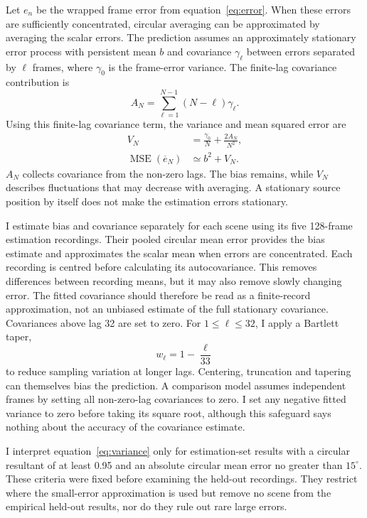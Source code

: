 \documentclass{edpsci}
\begin{document}
Let $e_n$ be the wrapped frame error from equation~\ref{eq:error}. When these errors are sufficiently concentrated, circular averaging can be approximated by averaging the scalar errors. The prediction assumes an approximately stationary error process with persistent mean $b$ and covariance $\gamma_\ell$ between errors separated by $\ell$ frames, where $\gamma_0$ is the frame-error variance. The finite-lag covariance contribution is
\begin{equation}
	A_N
	=
	\sum_{\ell=1}^{N-1}(N-\ell)\gamma_\ell.
\end{equation}
Using this finite-lag covariance term, the variance and mean squared error are
\begin{equation}
	\begin{aligned}
		V_N
		&=
		\frac{\gamma_0}{N}
		+\frac{2A_N}{N^2},\\
		\operatorname{MSE}(\overline{e}_N)
		&\simeq b^2+V_N.
	\end{aligned}
	\label{eq:variance}
\end{equation}
$A_N$ collects covariance from the non-zero lags. The bias remains, while $V_N$ describes fluctuations that may decrease with averaging. A stationary source position by itself does not make the estimation errors stationary.

I estimate bias and covariance separately for each scene using its five 128-frame estimation recordings. Their pooled circular mean error provides the bias estimate and approximates the scalar mean when errors are concentrated. Each recording is centred before calculating its autocovariance. This removes differences between recording means, but it may also remove slowly changing error. The fitted covariance should therefore be read as a finite-record approximation, not an unbiased estimate of the full stationary covariance. Covariances above lag 32 are set to zero. For $1\leq\ell\leq32$, I apply a Bartlett taper,
\begin{equation}
	w_\ell=1-\frac{\ell}{33}
\end{equation}
to reduce sampling variation at longer lags. Centering, truncation and tapering can themselves bias the prediction. A comparison model assumes independent frames by setting all non-zero-lag covariances to zero. I set any negative fitted variance to zero before taking its square root, although this safeguard says nothing about the accuracy of the covariance estimate.

I interpret equation~\ref{eq:variance} only for estimation-set results with a circular resultant of at least 0.95 and an absolute circular mean error no greater than $15^\circ$. These criteria were fixed before examining the held-out recordings. They restrict where the small-error approximation is used but remove no scene from the empirical held-out results, nor do they rule out rare large errors.
\end{document}
